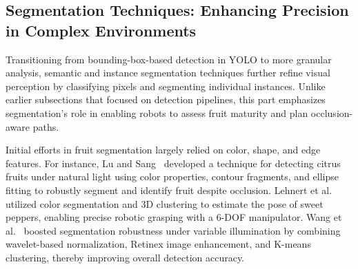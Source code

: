 \documentclass[a4paper,fleqn]{cas-dc}
\begin{document}
\subsection{Segmentation Techniques: Enhancing Precision in Complex Environments}
Transitioning from bounding-box-based detection in YOLO to more granular analysis, semantic and instance segmentation techniques further refine visual perception by classifying pixels and segmenting individual instances. Unlike earlier subsections that focused on detection pipelines, this part emphasizes segmentation's role in enabling robots to assess fruit maturity and plan occlusion-aware paths.

Initial efforts in fruit segmentation largely relied on color, shape, and edge features.
For instance, Lu and Sang~\cite{lu2015detecting} developed a technique for detecting citrus fruits under natural light using color properties, contour fragments, and ellipse fitting to robustly segment and identify fruit despite occlusion. 
Lehnert et al.~\cite{lehnert2016sweet} utilized color segmentation and 3D clustering to estimate the pose of sweet peppers, enabling precise robotic grasping with a 6-DOF manipulator. 
Wang et al.~\cite{wang2017robust} boosted segmentation robustness under variable illumination by combining wavelet-based normalization, Retinex image enhancement, and K-means clustering, thereby improving overall detection accuracy.
\end{document}
